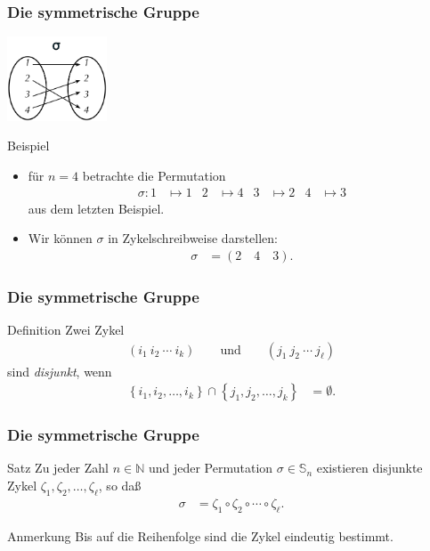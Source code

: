 \documentclass{beamer}
\renewcommand{\emph}[1]{{\textcolor{solarizedRed}{\itshape #1}}}
\newcommand\NN{\mathbb N}
\renewcommand\SS{\mathbb S}
\newcommand\bc[1]{\left({#1}\right)}
\newcommand\cbc[1]{\left\{{#1}\right\}}
\renewcommand{\oe}{\"o}
\newcommand{\ue}{\"u}
\begin{document}
\begin{frame}\frametitle{Die symmetrische Gruppe}
	\hfill\includegraphics[height=25mm]{pics/cycle.pdf}
	\begin{block}{Beispiel}
		\begin{itemize}
			\item f\ue r $n=4$ betrachte die Permutation 
				\begin{align*}
					\sigma:1&\mapsto1&2&\mapsto4&3&\mapsto2&4&\mapsto3
				\end{align*}
				aus dem letzten Beispiel.
			\item Wir k\oe nnen $\sigma$  in Zykelschreibweise darstellen:
				\begin{align*}
					\sigma&=(2\quad4\quad3).
				\end{align*}
		\end{itemize}
	\end{block}
\end{frame}

\begin{frame}\frametitle{Die symmetrische Gruppe}
	\begin{block}{Definition}
		Zwei Zykel
		\begin{align*}
			\bc{i_1\ i_2\ \cdots\ i_k}\qquad\mbox{und}\qquad\bc{j_1\ j_2\ \cdots\ j_\ell}
		\end{align*}
		sind \emph{disjunkt}, wenn
		\begin{align*}
			\cbc{i_1,i_2,\ldots,i_k}\cap\cbc{j_1,j_2,\ldots,j_k}&=\emptyset.
		\end{align*}
	\end{block}
\end{frame}

\begin{frame}\frametitle{Die symmetrische Gruppe}
	\begin{block}{Satz}
		Zu jeder Zahl $n\in\NN$ und jeder Permutation $\sigma\in\SS_n$ existieren disjunkte Zykel $\zeta_1,\zeta_2,\ldots,\zeta_\ell$, so da\ss
		\begin{align*}
			\sigma&=\zeta_1\circ\zeta_2\circ\cdots\circ\zeta_\ell.
		\end{align*}
	\end{block}
	\begin{block}{Anmerkung}
		Bis auf die Reihenfolge sind die Zykel eindeutig bestimmt.
	\end{block}
\end{frame}
\end{document}
